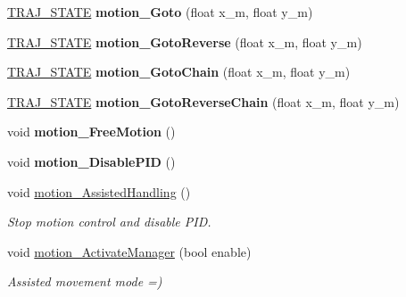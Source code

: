 \begin{DoxyCompactItemize}
\mbox{\label{classAsservDriver_a9ebb6ca2afa63158b2bc3d9e2f5f0412}} 
\hyperlink{path__manager_8h_adb3360abeb29758da93865c8afcb80eb}{T\+R\+A\+J\+\_\+\+S\+T\+A\+TE} {\bfseries motion\+\_\+\+Goto} (float x\+\_\+m, float y\+\_\+m)
\item 
\mbox{\label{classAsservDriver_a7c22c1e30e5e6c13f17051869ad6f9c8}} 
\hyperlink{path__manager_8h_adb3360abeb29758da93865c8afcb80eb}{T\+R\+A\+J\+\_\+\+S\+T\+A\+TE} {\bfseries motion\+\_\+\+Goto\+Reverse} (float x\+\_\+m, float y\+\_\+m)
\item 
\mbox{\label{classAsservDriver_abdc3ba07eb7741fdc868f3ae16f60175}} 
\hyperlink{path__manager_8h_adb3360abeb29758da93865c8afcb80eb}{T\+R\+A\+J\+\_\+\+S\+T\+A\+TE} {\bfseries motion\+\_\+\+Goto\+Chain} (float x\+\_\+m, float y\+\_\+m)
\item 
\mbox{\label{classAsservDriver_a54e7589cce70cc442b943df3c9b1818c}} 
\hyperlink{path__manager_8h_adb3360abeb29758da93865c8afcb80eb}{T\+R\+A\+J\+\_\+\+S\+T\+A\+TE} {\bfseries motion\+\_\+\+Goto\+Reverse\+Chain} (float x\+\_\+m, float y\+\_\+m)
\item 
\mbox{\label{classAsservDriver_aac603258c40d4c9aede0e5fce6ed4dea}} 
void {\bfseries motion\+\_\+\+Free\+Motion} ()
\item 
\mbox{\label{classAsservDriver_a0a68a702d1fea277c2e24e6dceb2d646}} 
void {\bfseries motion\+\_\+\+Disable\+P\+ID} ()
\item 
\mbox{\label{classAsservDriver_a733d0cddfdb612cea9e8097b348537f1}} 
void \hyperlink{classAsservDriver_a733d0cddfdb612cea9e8097b348537f1}{motion\+\_\+\+Assisted\+Handling} ()
\begin{DoxyCompactList}\small\item\em Stop motion control and disable P\+ID. \end{DoxyCompactList}\item 
\mbox{\label{classAsservDriver_aaeb3c80c8a079c812af38273f825c537}} 
void \hyperlink{classAsservDriver_aaeb3c80c8a079c812af38273f825c537}{motion\+\_\+\+Activate\+Manager} (bool enable)
\begin{DoxyCompactList}\small\item\em Assisted movement mode =) \end{DoxyCompactList}\item 

\end{DoxyCompactItemize}
